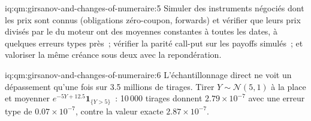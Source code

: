 \begin{solution}{iq:qm:girsanov-and-changes-of-numeraire:5}
Simuler des instruments négociés dont les prix sont connus (obligations zéro-coupon, forwards) et vérifier que
leurs prix divisés par le  du moteur ont des moyennes constantes à toutes les dates, à quelques
erreurs types près~; vérifier la parité call-put sur les payoffs simulés~; et valoriser la même créance sous deux
 avec la repondération.
\end{solution}

\begin{solution}{iq:qm:girsanov-and-changes-of-numeraire:6}
L'échantillonnage direct ne voit un dépassement qu'une fois sur 3.5 millions de tirages. Tirer $Y \sim \mathcal N(5, 1)$ à la place et moyenner
$e^{-5Y + 12.5}\mathbf 1_{\{Y > 5\}}$~: 10\,000 tirages donnent $2.79 \times 10^{-7}$ avec une erreur type de
$0.07 \times 10^{-7}$, contre la valeur exacte $2.87 \times 10^{-7}$.
\end{solution}
